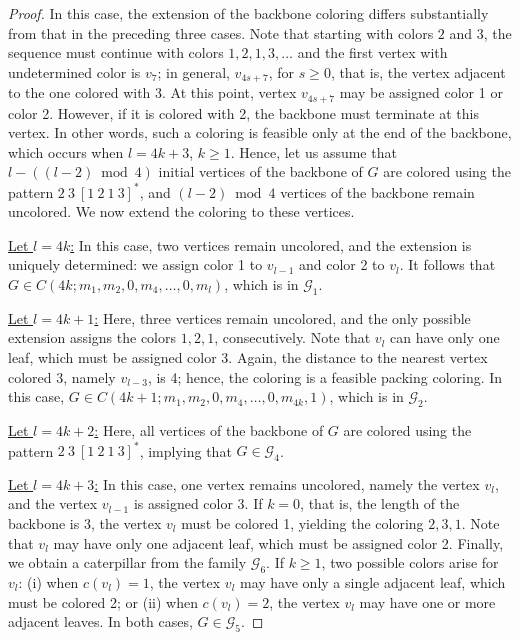 \documentclass[10pt,a4paper]{amsart}
\begin{document}
\begin{proof}
In this case, the extension of the backbone coloring differs substantially from that in the preceding three cases. Note that starting with colors $2$ and $3$, the sequence must continue with colors $1, 2, 1, 3, \ldots$ and the first vertex with undetermined color is $v_7$; in general, $v_{4s+7}$, for $s\geq 0$, that is, the vertex adjacent to the one colored with $3$. At this point, vertex $v_{4s+7}$ may be assigned color 1 or color 2. However, if it is colored with 2, the backbone must terminate at this vertex. In other words, such a coloring is feasible only at the end of the backbone, which occurs when $l=4k+3$, $k\geq 1$. Hence, let us assume that $l - ((l-2) \bmod 4)$ initial vertices of the backbone of $G$ are colored using the pattern $2\ 3\ [1\ 2\ 1\ 3]^*$, and $(l-2)\bmod 4$ vertices of the backbone remain uncolored. We now extend the coloring to these vertices.

\underline{Let $l=4k$:} 
In this case, two vertices remain uncolored, and the extension is uniquely determined: we assign color 1 to $v_{l-1}$ and color 2 to $v_l$. It follows that $G \in C(4k; m_1, m_2,0, m_4,\ldots, 0, m_l)$, which is in $\mathcal{G}_1$.

\underline{Let $l=4k+1$:} 
Here, three vertices remain uncolored, and the only possible extension assigns the colors $1,2,1$, consecutively. Note that $v_l$ can have only one leaf, which must be assigned color 3. Again, the distance to the nearest vertex colored 3, namely $v_{l-3}$, is 4; hence, the coloring is a feasible packing coloring.
In this case, $G\in C(4k+1; m_1,m_2,0,m_4,\ldots,0,m_{4k},1)$, which is in $\mathcal{G}_2$.

\underline{Let $l=4k+2$:} Here, all vertices of the backbone of $G$ are colored using the pattern $2\ 3\ [1\ 2\ 1\ 3]^*$, implying that $G\in \mathcal{G}_4$. 

\underline{Let $l=4k+3$:} In this case, one vertex remains uncolored, namely the vertex $v_l$, and the vertex $v_{l-1}$ is assigned color 3. If $k=0$, that is, the length of the backbone is 3, the vertex $v_l$ must be colored 1, yielding the coloring $2, 3, 1$. Note that $v_l$ may have only one adjacent leaf, which must be assigned color 2. Finally, we obtain a caterpillar from the family $\mathcal{G}_6$. If $k\geq 1$, two possible colors  arise for $v_l$: (i) when $c(v_l)=1$, the vertex $v_l$ may have only a single adjacent leaf, which must be colored 2; or (ii) when $c(v_l)=2$, the vertex $v_l$ may have one or more adjacent leaves. In both cases, $G \in \mathcal{G}_5$. 


\end{proof}
\end{document}
